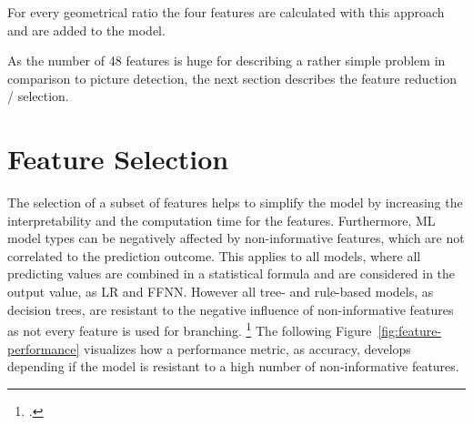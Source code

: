 For every geometrical ratio the four features are calculated with this approach and are added to the model.

\parbreak

As the number of 48 features is huge for describing a rather simple problem in comparison to picture detection, the next section
describes the feature reduction / selection.

\section{Feature Selection}
\label{sec:feature_engineering}

The selection of a subset of features helps to simplify the model by increasing the interpretability and the computation time
for the features. Furthermore, \gls{ML} model types can be negatively affected by non-informative features, which are not correlated
to the prediction outcome. This applies to all models, where all predicting values are combined in a statistical formula
and are considered in the output value, as \gls{LR} and \gls{FFNN}. However all tree- and rule-based models, as decision trees, are resistant
to the negative influence of non-informative features as not every feature is used for branching. \footcite[cf.][pp. 487-489]{kuhn_applied_2016}
The following Figure~\ref{fig:feature-performance} visualizes how a performance metric, as accuracy, develops depending if the model is
resistant to a high number of non-informative features.


